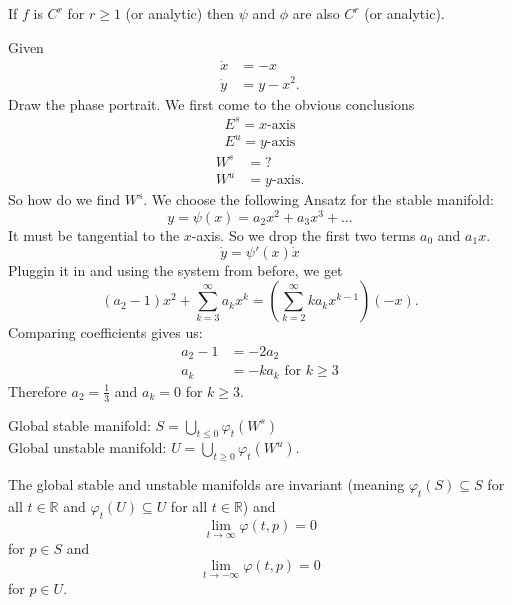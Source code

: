 \documentclass{article}
\newcommand*{\reci}[1]{{\frac{1}{#1}}}
\begin{document}
\begin{rem}
    If $f$ is $C^r$ for $r \geq 1$ (or analytic) then $\psi$ and $\phi$ are also $C^r$ (or analytic).
\end{rem}

\begin{exam}
    Given
    $$\begin{aligned}
        \dot x &= -x\\
        \dot y &= y-x^2.
    \end{aligned}$$
    Draw the phase portrait.
    We first come to the obvious conclusions
    $$\begin{aligned}
        E^s = x\text{-axis}\\
        E^u = y\text{-axis}
    \end{aligned}$$
    $$\begin{aligned}
        W^s &= ?\\
        W^u &= y\text{-axis}.
    \end{aligned}$$
    So how do we find $W^s$. We choose the following Ansatz for the stable manifold:
    $$y = \psi(x)=a_2x^2+a_3x^3+\dots$$
    It must be tangential to the $x$-axis. So we drop the first two terms $a_0$ and $a_1x$.
    $$\dot y = \psi'(x)\dot x$$
    Pluggin it in and using the system from before, we get
    $$(a_2-1)x^2+\sum_{k=3}^\infty a_kx^k=\left(\sum_{k=2}^\infty ka_kx^{k-1}\right)(-x).$$
    Comparing coefficients gives us:
    $$\begin{aligned}
        a_2-1 &=-2a_2\\
        a_k &= -ka_k \text{ for } k \geq 3
    \end{aligned}$$
    Therefore $a_2 = \reci3$ and $a_k = 0$ for $k\geq 3$.
\end{exam}

\begin{defin}
    Global stable manifold: $S = \bigcup_{t \leq 0} \varphi_t(W^s)$\\
    Global unstable manifold: $U=\bigcup_{t\geq 0}\varphi_t(W^u)$.
\end{defin}

\begin{prop}
    The global stable and unstable manifolds are invariant (meaning $\varphi_t(S)\subseteq S$ for all $t \in \mathbb{R}$ and $\varphi_t(U)\subseteq U$ for all $t \in \mathbb{R}$) and
    $$\lim_{t\to \infty}\varphi(t,p)=0$$
    for $p \in S$ and
    $$\lim_{t\to-\infty}\varphi(t,p) = 0$$
    for $p\in U$.
\end{prop}
\end{document}
